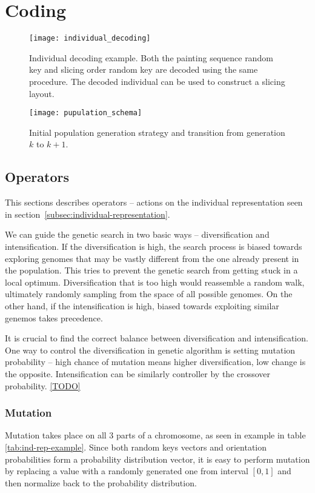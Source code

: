 \chapter{Coding}\label{ch:coding}

\begin{figure}[htp]
    \texttt{[image: individual\_decoding]}
    \caption{
        Individual decoding example. Both the painting sequence random key and slicing order random key
        are decoded using the same procedure. The decoded individual can be used to construct a slicing layout.
    }
    \label{fig:individual-decoding}
\end{figure}

\begin{figure}[htp]
    \texttt{[image: pupulation\_schema]}\label{fig:population-schema}
    \caption{Initial population generation strategy and transition from generation $k$ to $k+1$.}
\end{figure}


\section{Operators}\label{sec:operators}
This sections describes operators – actions on the individual representation
seen in section~\ref{subsec:individual-representation}.

We can guide the genetic search in two basic ways – diversification and intensification.
If the diversification is high, the search process is biased towards exploring genomes
that may be vastly different from the one already present in the population.
This tries to prevent the genetic search from getting stuck in a local optimum.
Diversification that is too high would reassemble a random walk, ultimately randomly sampling
from the space of all possible genomes. On the other hand, if the intensification is high,
biased towards exploiting similar genemos takes precedence.

It is crucial to find the correct balance between diversification and intensification.
One way to control the diversification in genetic algorithm is setting
mutation probability – high chance of mutation means higher diversification, low change is the opposite.
Intensification can be similarly controller by the crossover probability.
\ref{TODO}

\subsection{Mutation}\label{subsec:mutation}
Mutation takes place on all 3 parts of a chromosome, as seen in example in table \ref{tab:ind-rep-example}.
Since both random keys vectors and orientation probabilities form a probability distribution vector,
it is easy to perform mutation by replacing a value with a randomly generated one from interval $[0,1]$
and then normalize back to the probability distribution.

